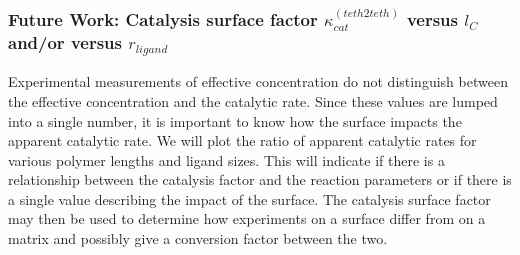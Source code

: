 \documentclass[../../AdvancementSummary.tex]{subfiles}
\begin{document}



\subsubsection{Future Work: Catalysis surface factor $\kappa^{(teth2teth)}_{cat}$ versus $l_C$ and/or versus $r_{ligand}$}

Experimental measurements of effective concentration do not distinguish between the effective concentration and the catalytic rate. Since these values are lumped into a single number, it is important to know how the surface impacts the apparent catalytic rate. We will plot the ratio of apparent catalytic rates for various polymer lengths and ligand sizes. This will indicate if there is a relationship between the catalysis factor and the reaction parameters or if there is a single value describing the impact of the surface. The catalysis surface factor may then be used to determine how experiments on a surface differ from on a matrix and possibly give a conversion factor between the two. 










\end{document}
